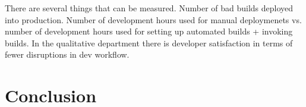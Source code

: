\documentclass{ituthesis}
\begin{document}
There are several things that can be measured. Number of bad builds deployed into production. Number of development hours used for manual deploymenets vs. number of development hours used for setting up automated builds + invoking builds. In the qualitative department there is developer satisfaction in terms of fewer disruptions in dev workflow. 

\chapter{Conclusion}

\clearpage

\renewcommand{\bibname}{References}

\end{document}
